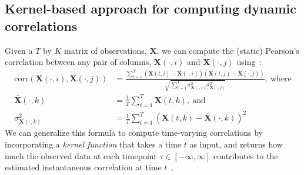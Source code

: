 \documentclass[english]{article}
\begin{document}
\subsection*{Kernel-based approach for computing dynamic correlations}
Given a $T$ by $K$ matrix of observations, $\mathbf{X}$, we can compute the (static)
Pearson's correlation between any pair of columns, $\mathbf{X}(\cdot, i)$ and
$\mathbf{X}(\cdot, j)$ using~\citep{Pear01}:
\begin{align}
  \mathrm{corr}(\mathbf{X}(\cdot, i), \mathbf{X}(\cdot, j)) &=
                                                              \frac{\sum_{t=1}^T
                                                              \left(\mathbf{X}(t,
                                                              i)
                                                              -
                                                              \bar{\mathbf{X}}(\cdot,
                                                              i)\right)
                                                              \left(\mathbf{X}(t,
                                                              j)
                                                              -
                                                              \bar{\mathbf{X}}(\cdot, j)\right)}{\sqrt{\sum_{t=1}^T
                                                              \sigma^2_{\mathbf{X}(\cdot, i)} 
                                                              \sigma^2_{\mathbf{X}(\cdot, j)}}},~\mathrm{where}\label{eqn:corr}\\
  \bar{\mathbf{X}}(\cdot, k) &= \frac{1}{T}\sum_{t=1}^T
                               \mathbf{X}(t, k),~\mathrm{and}\\
  \sigma^2_{\mathbf{X}(\cdot, k)} &= \frac{1}{T}\sum_{t=1}^T \left( \mathbf{X}(t, k) -
                                    \bar{\mathbf{X}}(\cdot, k) \right)^2 
\end{align}
We can generalize this formula to compute time-varying correlations by
incorporating a \textit{kernel function} that takes a time $t$ as
input, and returns how much the observed data at each timepoint
$\tau \in \left[ -\infty, \infty \right]$ contributes to the estimated instantaneous
correlation at time $t$~\citep[Fig.~\ref{fig:kernels}; also see][for a
similar approach]{AlleEtal12b}.
\end{document}
